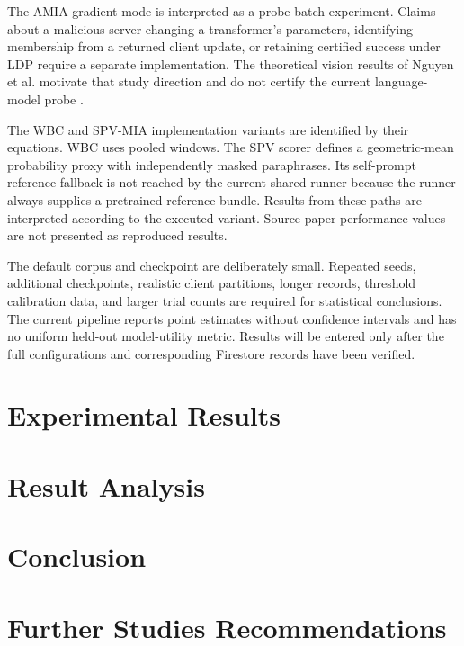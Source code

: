 \documentclass[11pt]{article}
\begin{document}
The AMIA gradient mode is interpreted as a probe-batch experiment. Claims about a malicious server changing a transformer's parameters, identifying membership from a returned client update, or retaining certified success under LDP require a separate implementation. The theoretical vision results of Nguyen et al. motivate that study direction and do not certify the current language-model probe \citep{nguyen2023active,nguyen2025theoretically}.

The WBC and SPV-MIA implementation variants are identified by their equations. WBC uses pooled windows. The SPV scorer defines a geometric-mean probability proxy with independently masked paraphrases. Its self-prompt reference fallback is not reached by the current shared runner because the runner always supplies a pretrained reference bundle. Results from these paths are interpreted according to the executed variant. Source-paper performance values are not presented as reproduced results.

The default corpus and checkpoint are deliberately small. Repeated seeds, additional checkpoints, realistic client partitions, longer records, threshold calibration data, and larger trial counts are required for statistical conclusions. The current pipeline reports point estimates without confidence intervals and has no uniform held-out model-utility metric. Results will be entered only after the full configurations and corresponding Firestore records have been verified.

\section{Experimental Results}

\section{Result Analysis}

\section{Conclusion}

\section{Further Studies Recommendations}



\end{document}
